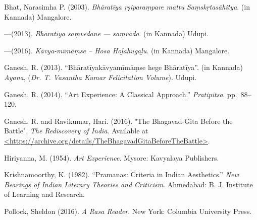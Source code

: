 \begin{thebibliography}{99}
\itemsep=2pt
Bhat, Narasimha P. (2003). \textsl{Bhāratīya ṛṣiparaṃpare mattu Saṃskṛtasāhitya}. (in Kannada) Mangalore. 

---\kern3pt(2013). \textsl{Bhāratīya saṃvedane --- saṃvāda}. (in Kannada) Udupi.

---\kern3pt(2016). \textsl{Kāvya-mīmāṃse -- Hosa Hoḻahugaḻu}. (in Kannada) Mangalore.

Ganesh, R. (2013). ``Bhāratīyakāvyamīmāṃse hege Bhāratīya''. (in Kannada) \textsl{Ayana}, (\textsl{Dr. T. Vasantha Kumar Felicitation Volume}). Udupi.

Ganesh, R. (2014). ``Art Experience: A Classical Approach.'' \textsl{Pratipitsa}. pp.~88--120.

Ganesh, R. and Ravikumar, Hari. (2016). "The Bhagavad-Gita Before the Battle". \textsl{The Rediscovery of India}. Available at \url{<https://archive.org/details/TheBhagavadGitaBeforeTheBattle>}.

Hiriyanna, M. (1954). \textsl{Art Experience}. Mysore: Kavyalaya Publishers.

Krishnamoorthy, K. (1982). ``Pramanas: Criteria in Indian Aesthetics.'' \textsl{New Bearings of Indian Literary Theories and Criticism}. Ahmedabad: B. J. Institute of Learning and Research.

Pollock, Sheldon (2016). \textsl{A Rasa Reader}. New York: Columbia University Press.
\end{thebibliography}

\theendnotes
